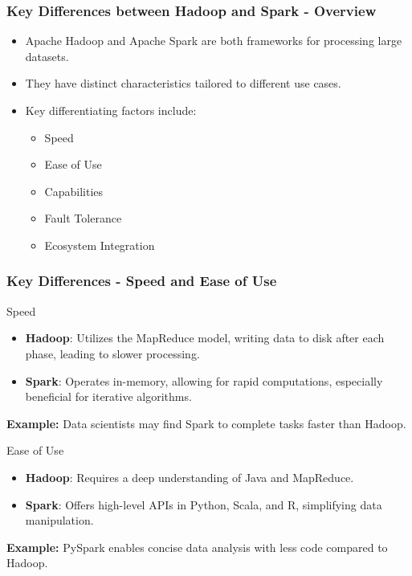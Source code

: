 \documentclass{beamer}
\begin{document}
\begin{frame}[fragile]
    \frametitle{Key Differences between Hadoop and Spark - Overview}
    \begin{itemize}
        \item Apache Hadoop and Apache Spark are both frameworks for processing large datasets.
        \item They have distinct characteristics tailored to different use cases.
        \item Key differentiating factors include:
        \begin{itemize}
            \item Speed
            \item Ease of Use
            \item Capabilities
            \item Fault Tolerance
            \item Ecosystem Integration
        \end{itemize}
    \end{itemize}
\end{frame}

\begin{frame}[fragile]
    \frametitle{Key Differences - Speed and Ease of Use}
    \begin{block}{Speed}
        \begin{itemize}
            \item \textbf{Hadoop}: Utilizes the MapReduce model, writing data to disk after each phase, leading to slower processing.
            \item \textbf{Spark}: Operates in-memory, allowing for rapid computations, especially beneficial for iterative algorithms.
        \end{itemize}
        \textbf{Example:} Data scientists may find Spark to complete tasks faster than Hadoop.
    \end{block}
    
    \begin{block}{Ease of Use}
        \begin{itemize}
            \item \textbf{Hadoop}: Requires a deep understanding of Java and MapReduce.
            \item \textbf{Spark}: Offers high-level APIs in Python, Scala, and R, simplifying data manipulation.
        \end{itemize}
        \textbf{Example:} PySpark enables concise data analysis with less code compared to Hadoop.
    \end{block}
\end{frame}
\end{document}
